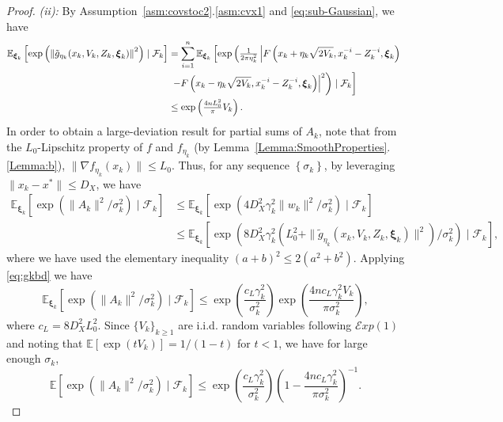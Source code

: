 \documentclass[11pt,reqno]{amsart}
\newcommand{\1}{{\bf 1}}
\newcommand{\2}{{\bf 2}}
\newcommand{\bxi}{\boldsymbol{\xi}}
\newcommand{\E}{\mathbb E}
\newcommand{\cf}{\mathcal F}
\newcommand{\lc}{\left[}
\newcommand{\rc}{\right]}
\numberwithin{equation}{section}
\theoremstyle{remark}
\begin{document}
{\begin{proof}
		
		\emph{(ii):} By Assumption~\ref{asm:covstoc2}.\ref{asm:cvx1} and \eqref{eq:sub-Gaussian}, we have
		\begin{align}\label{eq:gkbd} \notag
			\E_{\bxi_k}  \lc \exp\left(\left\| {\tilde{g}_{\eta_k}}(x_k,V_k,Z_k, \bxi_k)\right\|^2 \right) \mid \cf_k \rc 
			&= \sum_{i=1}^n \E_{\bxi_k} \left[\exp\left(\tfrac{1}{ 2\pi \eta_k^2} \left|F\left(x_k+\eta_k\sqrt{2V_k},x_k^{-i}-Z_k^{-i},\bxi_k\right) \right. \right. \right. \\
			& \left. \left. \left. -F\left(x_k-\eta_k\sqrt{2V_k},x_k^{-i}-Z_k^{-i},\bxi_k\right)\right|^2\right) \mid \cf_k \right] \nonumber \\
			&\leq \exp\left(\tfrac{4nL_0^2}{\pi}V_k\right).%
		\end{align}
		In order to obtain a large-deviation result for partial sums of $A_k$, note that from the $L_0$-Lipschitz property of $f$ and $f_{\eta_k}$ (by Lemma~\ref{Lemma:SmoothProperties}.\ref{Lemma:b}), $\|\nabla f_{\eta_k}(x_k)\| \leq L_0$. Thus, for any sequence $\left\{\sigma_k\right\}$, by leveraging $\|x_k - x^{\ast}\| \leq D_X$, we have 
		\begin{align*}
			\E_{\bxi_k} \lc \exp\left({\|A_k\|^2/\sigma_k^2} \right) \mid \cf_k \rc &\leq\E_{\bxi_k} \left[ \exp\left({4D_X^2\gamma_k^2\|w_k\|^2/\sigma_k^2}\right) \mid \cf_k \right]\\
			&\leq\E_{\bxi_k} \lc \exp\left({8D_X^2\gamma_k^2\left(L_0^2+\|\tilde{g}_{\eta_k}(x_k,V_k,Z_k, \bxi_k) \|^2\right)/\sigma_k^2}\right)\mid \cf_k \rc,
		\end{align*} 
		where we have used the elementary inequality $(a+b)^2 \leq 2(a^2 + b^2)$.
		Applying \eqref{eq:gkbd} we have
		\begin{equation*}
			\E_{\bxi_k}\left[ \exp\left({\|A_k\|^2/\sigma_k^2}\right)\mid \cf_k \right]
			\leq\exp\left(\frac{c_L\gamma_k^2}{\sigma_k^2}\right)\exp\left(\frac{4nc_L\gamma_k^2 V_k}{\pi\sigma_k^2}\right),
		\end{equation*}
		where $c_L=8D_X^2L_0^2$. Since $\{V_k\}_{k \geq 1}$ are i.i.d. random variables following $\mathcal{E}xp(1)$ and noting that $\E [\exp(t V_k)] = 1/(1-t)$ for $t < 1$, we have for large enough $\sigma_k$, 
		\begin{equation*}
			\E \left[\exp\left({\|A_k\|^2/\sigma_k^2}\right) \mid \cf_k \right]\leq\exp\left(\frac{c_L\gamma_k^2}{\sigma_k^2}\right)\left(1-\frac{4nc_L\gamma_k^2}{\pi\sigma_k^2}\right)^{-1}.

\end{equation*}
\end{proof}}
\end{document}

